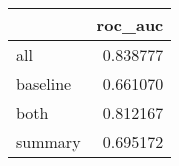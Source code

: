 \begin{tabular}{lr}
\toprule
{} &   roc\_auc \\
\midrule
all      &  0.838777 \\
baseline &  0.661070 \\
both     &  0.812167 \\
summary  &  0.695172 \\
\bottomrule
\end{tabular}
